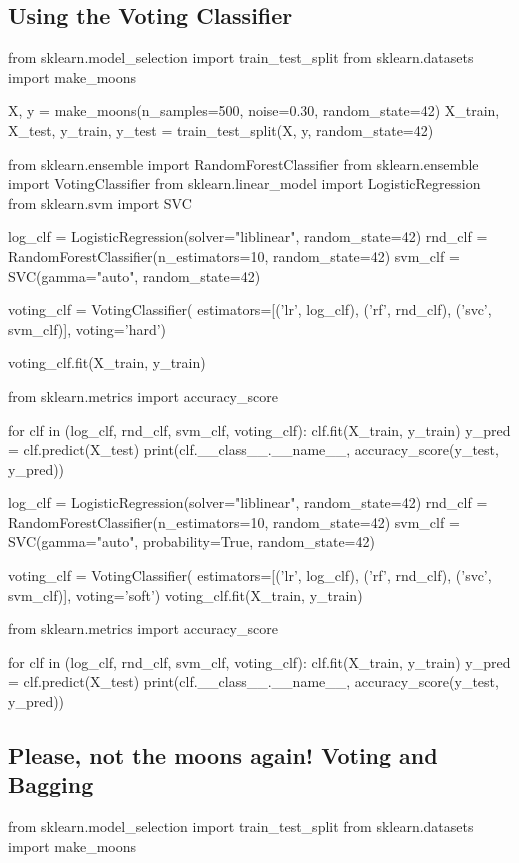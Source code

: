 \documentclass[%
oneside,                 %
final,                   %
10pt]{article}
\begin{document}
\epycod

\subsection{Using the Voting Classifier}
\bpycod
from sklearn.model_selection import train_test_split
from sklearn.datasets import make_moons

X, y = make_moons(n_samples=500, noise=0.30, random_state=42)
X_train, X_test, y_train, y_test = train_test_split(X, y, random_state=42)

from sklearn.ensemble import RandomForestClassifier
from sklearn.ensemble import VotingClassifier
from sklearn.linear_model import LogisticRegression
from sklearn.svm import SVC

log_clf = LogisticRegression(solver="liblinear", random_state=42)
rnd_clf = RandomForestClassifier(n_estimators=10, random_state=42)
svm_clf = SVC(gamma="auto", random_state=42)

voting_clf = VotingClassifier(
    estimators=[('lr', log_clf), ('rf', rnd_clf), ('svc', svm_clf)],
    voting='hard')

voting_clf.fit(X_train, y_train)

from sklearn.metrics import accuracy_score

for clf in (log_clf, rnd_clf, svm_clf, voting_clf):
    clf.fit(X_train, y_train)
    y_pred = clf.predict(X_test)
    print(clf.__class__.__name__, accuracy_score(y_test, y_pred))

log_clf = LogisticRegression(solver="liblinear", random_state=42)
rnd_clf = RandomForestClassifier(n_estimators=10, random_state=42)
svm_clf = SVC(gamma="auto", probability=True, random_state=42)

voting_clf = VotingClassifier(
    estimators=[('lr', log_clf), ('rf', rnd_clf), ('svc', svm_clf)],
    voting='soft')
voting_clf.fit(X_train, y_train)

from sklearn.metrics import accuracy_score

for clf in (log_clf, rnd_clf, svm_clf, voting_clf):
    clf.fit(X_train, y_train)
    y_pred = clf.predict(X_test)
    print(clf.__class__.__name__, accuracy_score(y_test, y_pred))

\epycod

\subsection{Please, not the moons again! Voting and Bagging}
\bpycod
from sklearn.model_selection import train_test_split
from sklearn.datasets import make_moons
\end{document}
